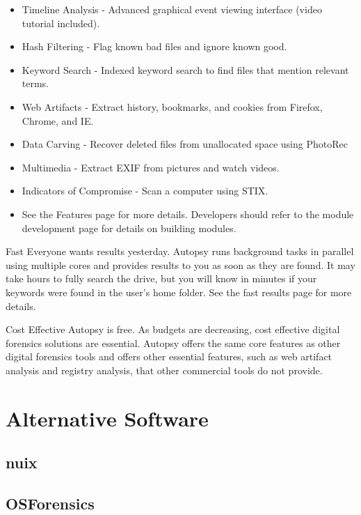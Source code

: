 \begin{itemize}
\item Timeline Analysis - Advanced graphical event viewing interface (video 
tutorial included).
\item Hash Filtering - Flag known bad files and ignore known good.
\item Keyword Search - Indexed keyword search to find files that mention relevant
terms.
\item Web Artifacts - Extract history, bookmarks, and cookies from Firefox, Chrome,
and IE.
\item Data Carving - Recover deleted files from unallocated space using PhotoRec
\item Multimedia - Extract EXIF from pictures and watch videos.
\item Indicators of Compromise - Scan a computer using STIX.
\item See the Features page for more details. Developers should refer to the
module development page for details on building modules.
\end{itemize}

Fast
Everyone wants results yesterday. Autopsy runs background tasks in parallel using multiple cores and provides results to you as soon as they are found. It may take hours to fully search the drive, but you will know in minutes if your keywords were found in the user's home folder. See the fast results page for more details.

Cost Effective
Autopsy is free. As budgets are decreasing, cost effective digital forensics solutions are essential. Autopsy offers the same core features as other digital forensics tools and offers other essential features, such as web artifact analysis and registry analysis, that other commercial tools do not provide.

\section{Alternative Software}


\subsection{nuix}


\subsection{OSForensics}


